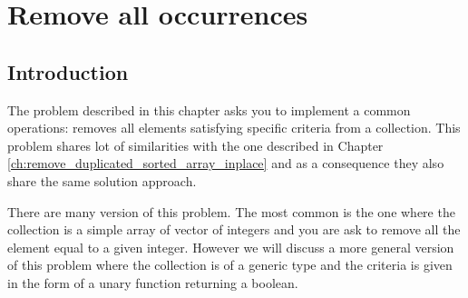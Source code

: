 %



\chapter{Remove all occurrences}
\label{ch:remove_all_occurrences_unsorted_array_inplace}
\section*{Introduction}
The problem described in this chapter asks you to implement a common operations: 
removes all elements satisfying specific criteria from a collection.
This problem shares  lot of similarities with the one described in Chapter \ref{ch:remove_duplicated_sorted_array_inplace}
and as a consequence they also share the same solution approach. 

There are many version of this problem. The most common is the one where the collection is a simple array of vector of integers
and you are ask to remove all the element equal to a given integer.
However we will discuss a more general version of this problem where the collection is of a generic type 
and the criteria is given in the form of a unary function returning a boolean.

